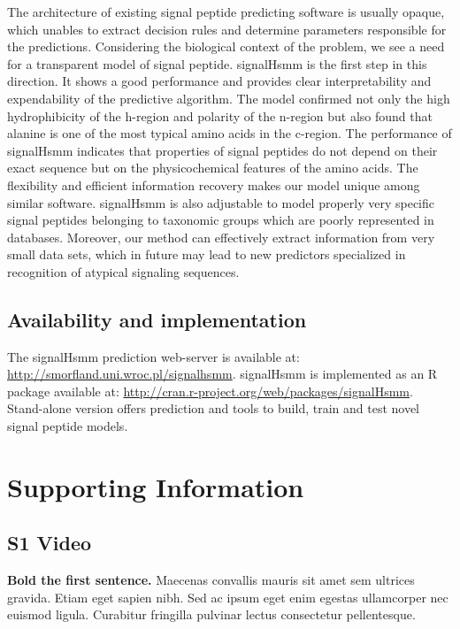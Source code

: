 \documentclass[10pt,letterpaper]{article}
\begin{document}
The architecture of existing signal peptide predicting software is usually opaque, which unables to extract decision rules and determine parameters responsible for the predictions. Considering the biological context of the problem, we see a need for a transparent model of signal peptide. signalHsmm is the first step in this direction. 
It shows a good performance and provides clear interpretability and expendability of  the predictive algorithm. 
The model confirmed not only the high hydrophibicity of the h-region and polarity of the n-region but also found that alanine is one of the most typical amino acids in the c-region.
The performance of signalHsmm indicates that properties of signal peptides do not depend on their exact sequence but on the physicochemical features of the amino acids. 
The flexibility and efficient information recovery makes our model unique among similar software. signalHsmm is also adjustable to model properly very specific signal peptides belonging to taxonomic groups which are poorly represented in databases. Moreover, our method can effectively extract information from very small data sets, which in future may lead to new predictors specialized in recognition of atypical signaling sequences.

\subsection*{Availability and implementation}
The signalHsmm prediction web-server is available at: \url{http://smorfland.uni.wroc.pl/signalhsmm}. signalHsmm is implemented as an R package available at: \url{http://cran.r-project.org/web/packages/signalHsmm}. Stand-alone version offers prediction and tools to build, train and test novel signal peptide models.

\section*{Supporting Information}

\subsection*{S1 Video}
\label{S1_Video}
{\bf Bold the first sentence.}  Maecenas convallis mauris sit amet sem ultrices gravida. Etiam eget sapien nibh. Sed ac ipsum eget enim egestas ullamcorper nec euismod ligula. Curabitur fringilla pulvinar lectus consectetur pellentesque.
\end{document}
